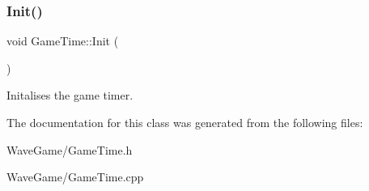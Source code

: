 \mbox{\label{class_game_time_a1f310e807ddb53d1a1278c4a0a2785ed}} 
\subsubsection{\texorpdfstring{Init()}{Init()}}
{\footnotesize\ttfamily void Game\+Time\+::\+Init (\begin{DoxyParamCaption}{ }\end{DoxyParamCaption})\hspace{0.3cm}{\ttfamily [static]}}



Initalises the game timer. 



The documentation for this class was generated from the following files\+:\begin{DoxyCompactItemize}
\item 
Wave\+Game/Game\+Time.\+h\item 
Wave\+Game/Game\+Time.\+cpp\end{DoxyCompactItemize}
